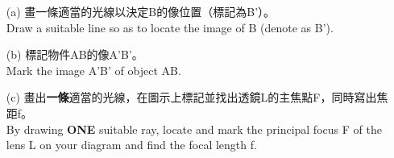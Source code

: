 \documentclass[beamer=true]{standalone}
\begin{document}
\begin{eg}
    \begin{itemize}
        \setlength{\itemsep}{0.8em}
        \item [(a)] 畫一條適當的光線以決定B的像位置（標記為B'）。\\Draw a suitable line so as to locate the image of B (denote as B').
        \item [(b)] 標記物件AB的像A'B'。\\Mark the image A'B' of object AB.
        \item [(c)] 畫出\textbf{一條}適當的光線，在圖示上標記並找出透鏡L的主焦點F，同時寫出焦距f。\\By drawing \textbf{ONE} suitable ray, locate and mark the principal focus F of the lens L on your diagram and find the focal length f.
    \end{itemize}
\end{eg}
\end{document}

